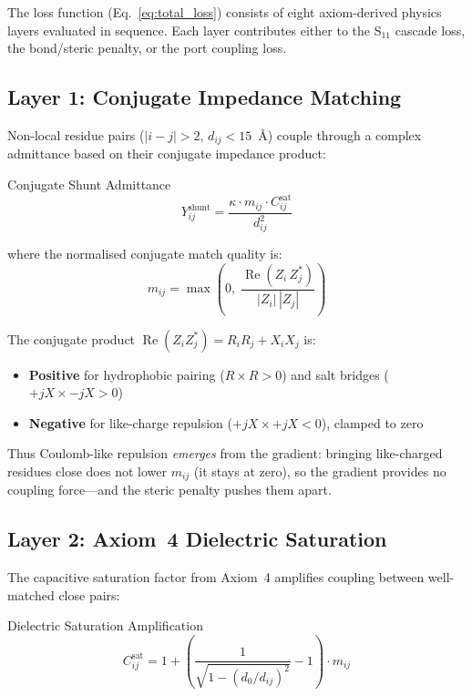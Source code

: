 The loss function (Eq.~\ref{eq:total_loss}) consists of eight axiom-derived physics layers evaluated in sequence.  Each layer contributes either to the S$_{11}$ cascade loss, the bond/steric penalty, or the port coupling loss.

\subsection{Layer 1: Conjugate Impedance Matching}

Non-local residue pairs ($|i-j| > 2$, $d_{ij} < 15$~\AA) couple through a complex admittance based on their conjugate impedance product:

\begin{resultbox}{Conjugate Shunt Admittance}
\begin{equation}
    Y_{ij}^{\text{shunt}} = \frac{\kappa \cdot m_{ij} \cdot C_{ij}^{\text{sat}}}{d_{ij}^2}
    \label{eq:shunt_admittance}
\end{equation}
\end{resultbox}
where the normalised conjugate match quality is:
\begin{equation}
    m_{ij} = \max\!\left(0,\; \frac{\operatorname{Re}(Z_i \, Z_j^*)}{|Z_i|\,|Z_j|}\right)
    \label{eq:match_quality}
\end{equation}

The conjugate product $\operatorname{Re}(Z_i Z_j^*) = R_i R_j + X_i X_j$ is:
\begin{itemize}
    \item \textbf{Positive} for hydrophobic pairing ($R \times R > 0$) and salt bridges ($+jX \times -jX > 0$)
    \item \textbf{Negative} for like-charge repulsion ($+jX \times +jX < 0$), clamped to zero
\end{itemize}

Thus Coulomb-like repulsion \emph{emerges} from the gradient: bringing like-charged residues close does not lower $m_{ij}$ (it stays at zero), so the gradient provides no coupling force---and the steric penalty pushes them apart.

\subsection{Layer 2: Axiom~4 Dielectric Saturation}

The capacitive saturation factor from Axiom~4 amplifies coupling between well-matched close pairs:

\begin{resultbox}{Dielectric Saturation Amplification}
\begin{equation}
    C_{ij}^{\text{sat}} = 1 + \left(\frac{1}{\sqrt{1 - (d_0/d_{ij})^2}} - 1\right) \cdot m_{ij}
    \label{eq:c_sat}
\end{equation}
\end{resultbox}

